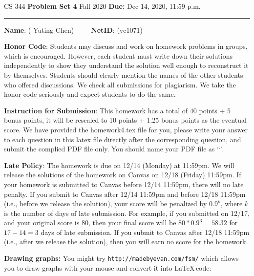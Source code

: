 \documentclass[12pt]{article}
\begin{document}
\noindent
CS 344 \hfill \textbf{Problem Set 4} \newline 
{Fall 2020} \hfill \textbf{Due:} Dec 14, 2020, 11:59 p.m.

\noindent
\rule{\linewidth}{0.4pt}
\vspace{.4cm}

\textbf{Name}: ({\color{blue} Yuting Chen})~~~~~\textbf{NetID}: ({\color{blue}yc1071})

\vspace{.5cm}

\textbf{Honor Code}: Students may discuss and work on homework problems in groups, which is encouraged. However, each student must write down their solutions independently to show they understand the solution well enough to reconstruct it by themselves.  Students should clearly mention the names of the other students who offered discussions. We check all submissions for plagiarism. We take the honor code seriously and expect students to do the same.


\vspace{.5cm}

\textbf{Instruction for Submission}: This homework has a total of 40 points + 5 bonus points, it will be rescaled to 10 points + 1.25 bonus points as the eventual score. We have provided the homework4.tex file for you, please write your answer to each question in this latex file directly after the corresponding question, and submit the complied PDF file only. You should name your PDF file as ``{\color{blue}{Firstname-Lastname-NetID.pdf'}}'.

\vspace{.5cm}

\textbf{Late Policy}: The homework is due on 12/14 (Monday) at 11:59pm. We will release the solutions of the homework on Canvas on 12/18 (Friday) 11:59pm. If your homework is submitted to Canvas before 12/14 11:59pm, there will no late penalty. If you submit to Canvas after 12/14 11:59pm and before 12/18 11:59pm (i.e., before we release the solution), your score will be penalized by $0.9^k$, where $k$ is the number of days of late submission. For example, if you submitted on 12/17, and your original score is 80, then your final score will be $80*0.9^3=58.32$ for $17-14=3$ days of late submission. If you submit to Canvas after 12/18 11:59pm (i.e., after we release the solution), then you will earn no score for the homework.

\vspace{.5cm}

\noindent
\textbf{Drawing graphs:} You might try \texttt{http://madebyevan.com/fsm/} which allows you to draw graphs with your mouse and convert it into \LaTeX  \,code:
\end{document}
